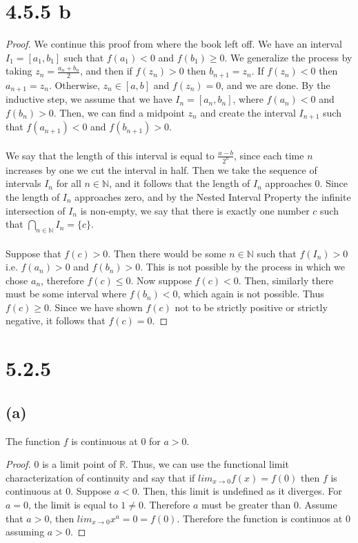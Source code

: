 \documentclass{article}
\begin{document}
\section*{4.5.5 b}
\begin{proof}
We continue this proof from where the book left off. We have an interval $I_1 = [a_1, b_1]$ such that $f(a_1) < 0$ and $f(b_1) \geqslant 0$. We generalize the process by taking $z_n = \frac{a_n + b_n}{2}$, and then if $f(z_n) > 0$ then $b_{n+1} = z_n$. If $f(z_n) < 0$ then $a_{n+1} = z_n$. Otherwise, $z_n \in [a,b]$ and $f(z_n) = 0$, and we are done. By the inductive step, we assume that we have $I_n = [a_n, b_n]$, where $f(a_n) < 0$ and $f(b_n) > 0$. Then, we can find a midpoint $z_n$ and create the interval $I_{n+1}$ such that $f(a_{n+1}) < 0$ and $f(b_{n+1}) > 0$. \\\\
We say that the length of this interval is equal to $\frac{a-b}{2^n}$, since each time $n$ increases by one we cut the interval in half. Then we take the sequence of intervals $I_n$ for all $n \in \mathbb{N}$, and it follows that the length of $I_n$ approaches 0. Since the length of $I_n$ approaches zero, and by the Nested Interval Property the infinite intersection of $I_n$ is non-empty, we say that there is exactly one number $c$ such that $\bigcap_{n \in \mathbb{N}}I_n = \{c\}$. \\\\
Suppose that $f(c) > 0$. Then there would be some $n \in \mathbb{N}$ such that $f(I_n) > 0$ i.e. $f(a_n) > 0$ and $f(b_n) > 0$. This is not possible by the process in which we chose $a_n$, therefore $f(c) \leqslant 0$. Now suppose $f(c) < 0$. Then, similarly there must be some interval where $f(b_n) < 0$, which again is not possible. Thus $f(c )\geqslant 0$. Since we have shown $f(c)$ not to be strictly positive or strictly negative, it follows that $f(c) = 0$.
\end{proof}

\section*{5.2.5}
\subsection*{(a)}
The function $f$ is continuous at 0 for $a > 0$.
\begin{proof}
0 is a limit point of $\mathbb{R}$. Thus, we can use the functional limit characterization of continuity and say that if $lim_{x \rightarrow 0}f(x) = f(0)$ then $f$ is continuous at 0. Suppose $a < 0$. Then, this limit is undefined as it diverges. For $a=0$, the limit is equal to $1 \neq 0$. Therefore $a$ must be greater than 0. Assume that $a > 0$, then $lim_{x \rightarrow 0}x^a = 0 = f(0)$. Therefore the function is continuos at $0$ assuming $a > 0$.
\end{proof}
\end{document}

